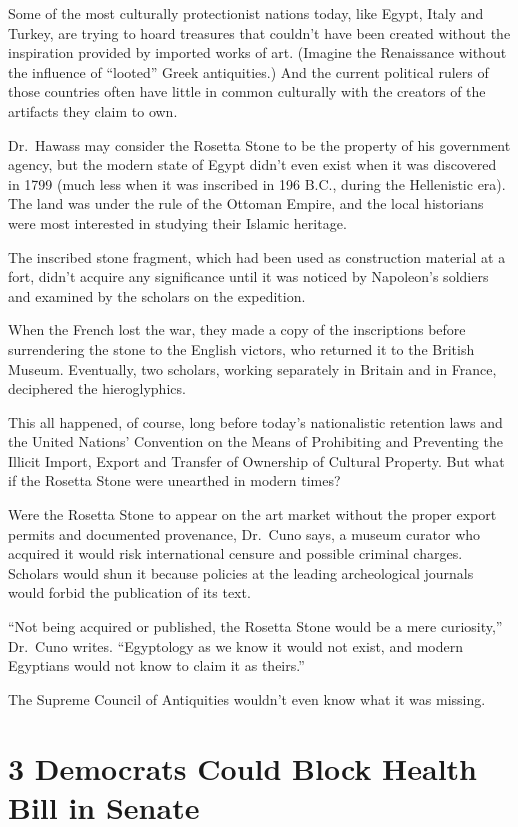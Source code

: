 ﻿\documentclass[12pt]{article}
\begin{document}
Some of the most culturally protectionist nations today, like Egypt, Italy and Turkey, are trying to
hoard treasures that couldn't have been created without the inspiration provided by imported works
of art. (Imagine the Renaissance without the influence of ``looted'' Greek antiquities.) And the
current political rulers of those countries often have little in common culturally with the creators
of the artifacts they claim to own.

Dr.~Hawass may consider the Rosetta Stone to be the property of his government agency, but the
modern state of Egypt didn't even exist when it was discovered in 1799 (much less when it was
inscribed in 196 B.C., during the Hellenistic era). The land was under the rule of the Ottoman
Empire, and the local historians were most interested in studying their Islamic heritage.

The inscribed stone fragment, which had been used as construction material at a fort, didn't acquire
any significance until it was noticed by Napoleon's soldiers and examined by the scholars on the
expedition.

When the French lost the war, they made a copy of the inscriptions before surrendering the stone to
the English victors, who returned it to the British Museum. Eventually, two scholars, working
separately in Britain and in France, deciphered the hieroglyphics.

This all happened, of course, long before today's nationalistic retention laws and the United
Nations' Convention on the Means of Prohibiting and Preventing the Illicit Import, Export and
Transfer of Ownership of Cultural Property. But what if the Rosetta Stone were unearthed in modern
times?

Were the Rosetta Stone to appear on the art market without the proper export permits and documented
provenance, Dr.~Cuno says, a museum curator who acquired it would risk international censure and
possible criminal charges. Scholars would shun it because policies at the leading archeological
journals would forbid the publication of its text.

``Not being acquired or published, the Rosetta Stone would be a mere curiosity,'' Dr.~Cuno writes.
``Egyptology as we know it would not exist, and modern Egyptians would not know to claim it as
theirs.''

The Supreme Council of Antiquities wouldn't even know what it was missing.

\section{3 Democrats Could Block Health Bill in Senate}
\end{document}
